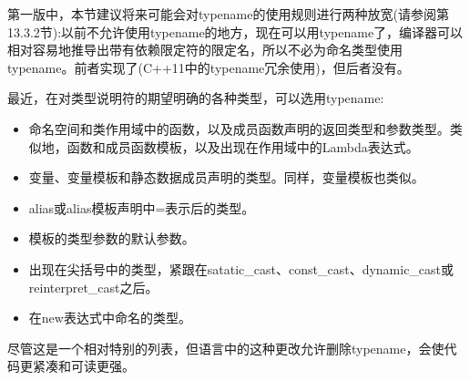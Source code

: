 
第一版中，本节建议将来可能会对typename的使用规则进行两种放宽(请参阅第13.3.2节):以前不允许使用typename的地方，现在可以用typename了，编译器可以相对容易地推导出带有依赖限定符的限定名，所以不必为命名类型使用typename。前者实现了(C++11中的typename冗余使用)，但后者没有。

最近，在对类型说明符的期望明确的各种类型，可以选用typename:

\begin{itemize}
\item 
命名空间和类作用域中的函数，以及成员函数声明的返回类型和参数类型。类似地，函数和成员函数模板，以及出现在作用域中的Lambda表达式。

\item 
变量、变量模板和静态数据成员声明的类型。同样，变量模板也类似。

\item 
alias或alias模板声明中=表示后的类型。

\item 
模板的类型参数的默认参数。

\item 
出现在尖括号中的类型，紧跟在satatic\_cast、const\_cast、dynamic\_cast或reinterpret\_cast之后。

\item 
在new表达式中命名的类型。
\end{itemize}

尽管这是一个相对特别的列表，但语言中的这种更改允许删除typename，会使代码更紧凑和可读更强。

